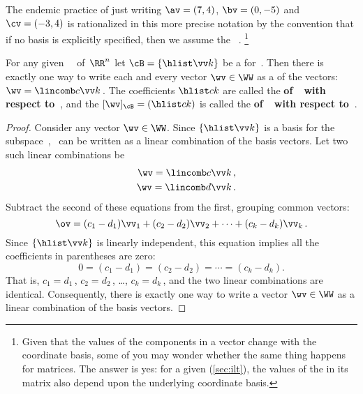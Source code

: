 \begin{example}
The endemic practice of just writing \(\av=(7,4)\), \(\bv=(0,-5)\) and \(\cv=(-3,4)\) is rationalized in this more precise notation by the convention that if no basis is explicitly specified, then we assume the ~\cE.%
\footnote{Given that the values of the components in a vector change with the coordinate basis, some of you may wonder whether the same thing happens for matrices.  
The answer is yes:  for a given  (\cref{sec:ilt}), the values of the  in its matrix also depend upon the underlying coordinate basis. }
\end{example}



\begin{theorem} \label{thm:ssbc} 
For any given ~\WW\ of~\(\RR^n\) let \(\cB=\{\hlist\vv k\}\) be a  for~\WW.  
Then there is exactly one way to write each and every vector \(\wv\in\WW\) as a  of the  vectors: \(\wv=\lincomb c\vv k\)\,.
The coefficients \(\hlist ck\) are called the \textbf{ of~\wv\ with respect to~\cB}, and the  \([\wv]_{\cB}=(\hlist ck)\) is called the \textbf{ of~\wv\ with respect to~\cB}.
\end{theorem}
\begin{proof}  
Consider any vector \(\wv\in\WW\).
Since \(\{\hlist\vv k\}\) is a basis for the subspace~\WW, \wv~can be written as a linear combination of the basis vectors. 
Let two such linear combinations be
\begin{eqnarray*}&&
\wv=\lincomb c\vv k\,,
\\&&
\wv=\lincomb d\vv k\,.
\end{eqnarray*}
Subtract the second of these equations from the first, grouping common vectors:
\begin{equation*}
\ov=(c_1-d_1)\vv_1+(c_2-d_2)\vv_2+\cdots+(c_k-d_k)\vv_k\,.
\end{equation*}
Since \(\{\hlist\vv k\}\) is linearly independent, this equation implies all the coefficients in parentheses are zero:
\begin{equation*}
0=(c_1-d_1)=(c_2-d_2)=\cdots=(c_k-d_k).
\end{equation*}
That is, \(c_1=d_1\)\,, \(c_2=d_2\)\,, \ldots, \(c_k=d_k\)\,, and the two linear combinations are identical.
Consequently, there is exactly one way to write a vector \(\wv\in\WW\) as a {linear combination} of the {basis} vectors.
\end{proof}


